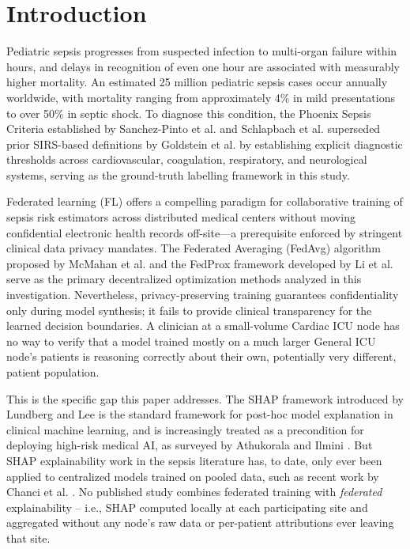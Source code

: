 \documentclass[runningheads]{llncs}
\begin{document}
\section{Introduction}\label{sec:intro}

Pediatric sepsis progresses from suspected infection to multi-organ failure within hours, and delays in recognition of even one hour are associated with measurably higher mortality. An estimated 25 million pediatric sepsis cases occur annually worldwide, with mortality ranging from approximately 4\% in mild presentations to over 50\% in septic shock. To diagnose this condition, the Phoenix Sepsis Criteria established by Sanchez-Pinto et al. \cite{sanchezpinto2024phoenix} and Schlapbach et al. \cite{schlapbach2024phoenix} superseded prior SIRS-based definitions by Goldstein et al. \cite{goldstein2005sirs} by establishing explicit diagnostic thresholds across cardiovascular, coagulation, respiratory, and neurological systems, serving as the ground-truth labelling framework in this study.

Federated learning (FL) offers a compelling paradigm for collaborative training of sepsis risk estimators across distributed medical centers without moving confidential electronic health records off-site---a prerequisite enforced by stringent clinical data privacy mandates. The Federated Averaging (FedAvg) algorithm proposed by McMahan et al. \cite{mcmahan2017fedavg} and the FedProx framework developed by Li et al. \cite{li2020fedprox} serve as the primary decentralized optimization methods analyzed in this investigation. Nevertheless, privacy-preserving training guarantees confidentiality only during model synthesis; it fails to provide clinical transparency for the learned decision boundaries. A clinician at a small-volume Cardiac ICU node has no way to verify that a model trained mostly on a much larger General ICU node's patients is reasoning correctly about their own, potentially very different, patient population.

This is the specific gap this paper addresses. The SHAP framework introduced by Lundberg and Lee \cite{lundberg2017shap} is the standard framework for post-hoc model explanation in clinical machine learning, and is increasingly treated as a precondition for deploying high-risk medical AI, as surveyed by Athukorala and Ilmini \cite{athukorala2026explainable}. But SHAP explainability work in the sepsis literature has, to date, only ever been applied to centralized models trained on pooled data, such as recent work by Chanci et al. \cite{chanci2025machine}. No published study combines federated training with \emph{federated} explainability -- i.e., SHAP computed locally at each participating site and aggregated without any node's raw data or per-patient attributions ever leaving that site.
\end{document}
